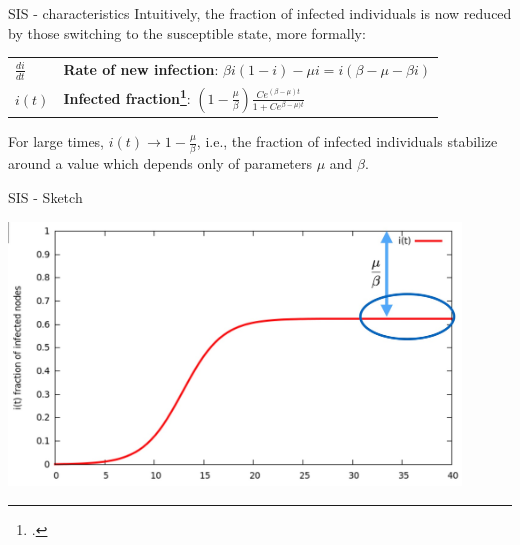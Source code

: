 \documentclass[a4paper,11pt]{book}
\begin{document}
\begin{textbox}{SIS - characteristics}
Intuitively, the fraction of infected individuals is now reduced by those switching to the susceptible state, more formally:

\begin{tabular}{p{}|p{}}\scriptsize

$\frac{di}{dt}$ & \textbf{Rate of new infection}: $\beta i(1-i) - \mu i=i(\beta - \mu - \beta i)$ \\



$i(t)$ & \textbf{Infected fraction\footcite{barrat2008dynamical}}: $\left( 1-\frac{\mu}{\beta }\right) \frac{Ce^{(\beta-\mu)t}}{1+Ce^{\beta-\mu)t}}$ \\

\end{tabular}


For large times, $i(t)\to 1-\frac{\mu}{\beta}$, i.e., the fraction of infected individuals stabilize around a value which depends only of parameters $\mu$ and $\beta$. 




\end{textbox}



\begin{textbox}{SIS - Sketch}

\centering
\includegraphics[width=0.9\textwidth]{pics/sisschema.jpg}
\end{textbox}
\end{document}
